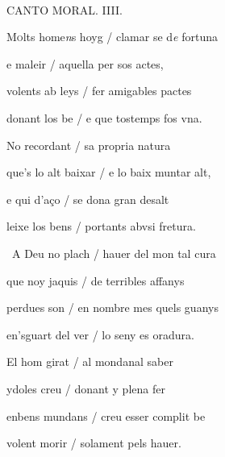 \documentclass[12pt]{article}
\renewcommand{\espaiAbansEtiquetaPoema}{\vspace{0ex}}
\begin{document}
\begin{estrofa}

\espaiAbansEtiquetaPoema

\\

\begin{rubrica}

CANTO MORAL. IIII.

\end{rubrica}

\end{estrofa}


\begin{estrofa}

 M\textsc{o}lts home\textit{n}s hoyg / clamar se d\textit{e} fortuna

 e maleir / aquella per sos actes,

 volents ab leys / fer amigables pactes

 donant los be / e que tostemps fos vna.

 No recordant / sa propria natura

 que's lo alt baixar / e lo baix muntar alt,

 e qui d'a\c{c}o / se dona gran desalt

 leixe los bens / portants abvsi fretura.

\end{estrofa}



\begin{estrofa}

 \textparagraph\  A Deu no plach / hauer del mon tal cura

 que noy jaquis / de terribles affanys

 perdues son / en nombre mes quels guanys

 en'sguart del ver / lo seny es oradura.

 El hom girat / al mondanal saber

 ydoles creu / donant y plena fer

 enbens mundans / creu esser complit be

 volent morir / solament pels hauer.

\end{estrofa}
\end{document}
